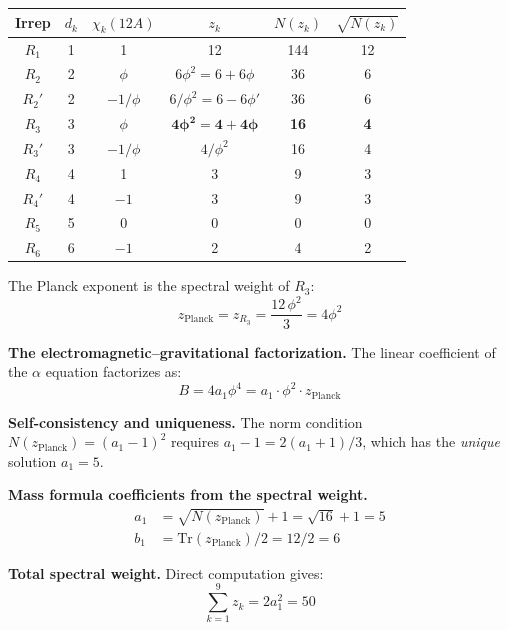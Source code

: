 \documentclass[12pt,a4paper]{article}
\theoremstyle{definition}
\begin{document}
\begin{center}
\begin{tabular}{cccccc}
\toprule
Irrep & $d_k$ & $\chi_k(12A)$ & $z_k$ & $N(z_k)$ & $\sqrt{N(z_k)}$ \\
\midrule
$R_1$ & 1 & 1        & 12       & 144 & 12 \\
$R_2$ & 2 & $\phi$   & $6\phi^2 = 6+6\phi$  & 36  & 6 \\
$R_2'$& 2 & $-1/\phi$& $6/\phi^2 = 6-6\phi'$ & 36  & 6 \\
$R_3$ & 3 & $\phi$   & $\mathbf{4\phi^2 = 4+4\phi}$  & \textbf{16}  & \textbf{4} \\
$R_3'$& 3 & $-1/\phi$& $4/\phi^2$ & 16  & 4 \\
$R_4$ & 4 & 1        & 3        & 9   & 3 \\
$R_4'$& 4 & $-1$     & 3        & 9   & 3 \\
$R_5$ & 5 & 0        & 0        & 0   & 0 \\
$R_6$ & 6 & $-1$     & 2        & 4   & 2 \\
\bottomrule
\end{tabular}
\end{center}

The Planck exponent is the spectral weight of $R_3$:
\begin{equation}
z_{\text{Planck}} = z_{R_3} = \frac{12\,\phi^2}{3} = 4\phi^2
\end{equation}

\textbf{The electromagnetic--gravitational factorization.}  The linear coefficient of the $\alpha$ equation factorizes as:
\begin{equation}
B = 4a_1\phi^4 = a_1 \cdot \phi^2 \cdot z_{\text{Planck}}
\end{equation}

\textbf{Self-consistency and uniqueness.}  The norm condition $N(z_{\text{Planck}}) = (a_1-1)^2$ requires $a_1 - 1 = 2(a_1+1)/3$, which has the \emph{unique} solution $a_1 = 5$.

\textbf{Mass formula coefficients from the spectral weight.}
\begin{align}
a_1 &= \sqrt{N(z_{\text{Planck}})} + 1 = \sqrt{16} + 1 = 5 \\
b_1 &= \text{Tr}(z_{\text{Planck}})/2 = 12/2 = 6
\end{align}

\textbf{Total spectral weight.}  Direct computation gives:
\begin{equation}
\sum_{k=1}^{9} z_k = 2a_1^2 = 50
\end{equation}
\end{document}
